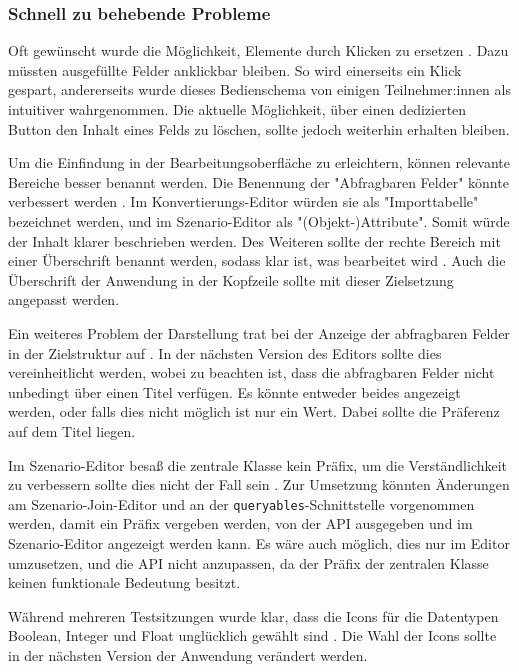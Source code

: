 \subsubsection{Schnell zu behebende Probleme}

Oft gewünscht wurde die Möglichkeit, Elemente durch Klicken zu ersetzen . Dazu müssten ausgefüllte Felder anklickbar bleiben. So wird einerseits ein Klick gespart, andererseits wurde dieses Bedienschema von einigen Teilnehmer:innen als intuitiver wahrgenommen. Die aktuelle Möglichkeit, über einen dedizierten Button den Inhalt eines Felds zu löschen, sollte jedoch weiterhin erhalten bleiben.

Um die Einfindung in der Bearbeitungsoberfläche zu erleichtern, können relevante Bereiche besser benannt werden. Die Benennung der "Abfragbaren Felder" könnte verbessert werden . Im Konvertierungs-Editor würden sie als "Importtabelle" bezeichnet werden, und im Szenario-Editor als "(Objekt-)Attribute". Somit würde der Inhalt klarer beschrieben werden. Des Weiteren sollte der rechte Bereich mit einer Überschrift benannt werden, sodass klar ist, was bearbeitet wird . Auch die Überschrift der Anwendung in der Kopfzeile sollte mit dieser Zielsetzung angepasst werden.

Ein weiteres Problem der Darstellung trat bei der Anzeige der abfragbaren Felder in der Zielstruktur auf . In der nächsten Version des Editors sollte dies vereinheitlicht werden, wobei zu beachten ist, dass die abfragbaren Felder nicht unbedingt über einen Titel verfügen. Es könnte entweder beides angezeigt werden, oder falls dies nicht möglich ist nur ein Wert. Dabei sollte die Präferenz auf dem Titel liegen.

Im Szenario-Editor besaß die zentrale Klasse kein Präfix, um die Verständlichkeit zu verbessern sollte dies nicht der Fall sein . Zur Umsetzung könnten Änderungen am Szenario-Join-Editor und an der \texttt{queryables}-Schnittstelle vorgenommen werden, damit ein Präfix vergeben werden, von der \ac{API} ausgegeben und im Szenario-Editor angezeigt werden kann. Es wäre auch möglich, dies nur im Editor umzusetzen, und die \ac{API} nicht anzupassen, da der Präfix der zentralen Klasse keinen funktionale Bedeutung besitzt.

Während mehreren Testsitzungen wurde klar, dass die Icons für die Datentypen Boolean, Integer und Float unglücklich gewählt sind . Die Wahl der Icons sollte in der nächsten Version der Anwendung verändert werden.

